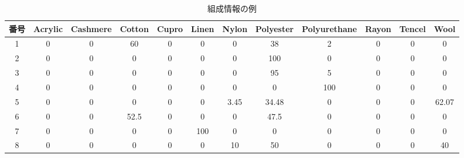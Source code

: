 \documentclass[a4paper,12pt]{jreport}
\begin{document}
\begin{landscape}
    
\begin{table}[tbh]
\begin{center}
\caption{組成情報の例}
\vspace{7mm}
\label{tab:5.1}
\begin{tabular}{|c|c|c|c|c|c|c|c|c|c|c|c|}
\hline
番号 & Acrylic & Cashmere & Cotton & Cupro & Linen & Nylon & Polyester & Polyurethane & Rayon & Tencel & Wool  \\ \hline
1  & 0       & 0        & 60     & 0     & 0     & 0     & 38        & 2            & 0     & 0      & 0     \\ \hline
2  & 0       & 0        & 0      & 0     & 0     & 0     & 100       & 0            & 0     & 0      & 0     \\ \hline
3  & 0       & 0        & 0      & 0     & 0     & 0     & 95        & 5            & 0     & 0      & 0     \\ \hline
4  & 0       & 0        & 0      & 0     & 0     & 0     & 0         & 100          & 0     & 0      & 0     \\ \hline
5  & 0       & 0        & 0      & 0     & 0     & 3.45  & 34.48     & 0            & 0     & 0      & 62.07 \\ \hline
6  & 0       & 0        & 52.5   & 0     & 0     & 0     & 47.5      & 0            & 0     & 0      & 0     \\ \hline
7  & 0       & 0        & 0      & 0     & 100   & 0     & 0         & 0            & 0     & 0      & 0     \\ \hline
8  & 0       & 0        & 0      & 0     & 0     & 10    & 50        & 0            & 0     & 0      & 40    \\ \hline
\end{tabular}
\end{center}
\end{table}

\end{landscape}
\end{document}
